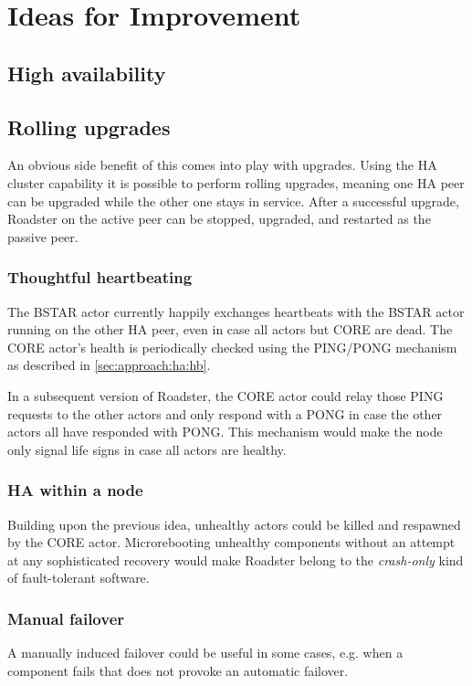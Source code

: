 \section{Ideas for Improvement}
\subsection{High availability}

\subsection{Rolling upgrades}
An obvious side benefit of this comes into play with upgrades. Using the HA
cluster capability it is possible to perform rolling upgrades, meaning one HA
peer can be upgraded while the other one stays in service. After a successful
upgrade, Roadster on the active peer can be stopped, upgraded, and restarted as
the passive peer.


\subsubsection{Thoughtful heartbeating}\label{sec:discussion:imp:ha:hb}
The BSTAR actor currently happily exchanges heartbeats with the BSTAR actor
running on the other HA peer, even in case all actors but CORE are dead. The
CORE actor's health is periodically checked using the PING/PONG mechanism as
described in \autoref{sec:approach:ha:hb}.

In a subsequent version of Roadster, the CORE actor could relay those PING
requests to the other actors and only respond with a PONG in case the other
actors all have responded with PONG. This mechanism would make the node only
signal life signs in case all actors are healthy.

\subsubsection{HA within a node}
Building upon the previous idea, unhealthy actors could be killed and respawned
by the CORE actor.  Microrebooting unhealthy components without an attempt at
any sophisticated recovery would make Roadster belong to the \emph{crash-only} kind of fault-tolerant software.

\subsubsection{Manual failover}\label{sec:discussion:ha:manual-failover}
A manually induced failover could be useful in some cases, e.g. when a
component fails that does not provoke an automatic failover.

